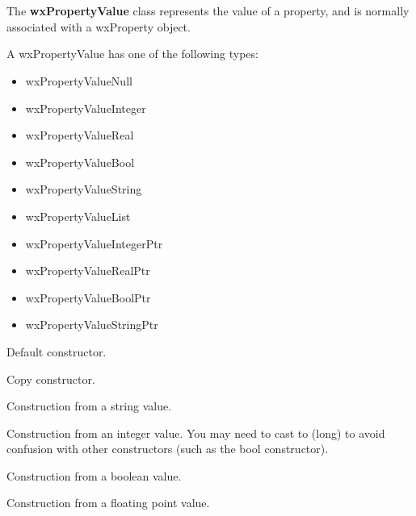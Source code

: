 \section{}\label{wxpropertyvalue}

The {\bf wxPropertyValue} class represents the value of a property,
and is normally associated with a wxProperty object.

A wxPropertyValue has one of the following types:

\begin{itemize}\itemsep=0pt
\item wxPropertyValueNull
\item wxPropertyValueInteger
\item wxPropertyValueReal
\item wxPropertyValueBool
\item wxPropertyValueString
\item wxPropertyValueList
\item wxPropertyValueIntegerPtr
\item wxPropertyValueRealPtr
\item wxPropertyValueBoolPtr
\item wxPropertyValueStringPtr
\end{itemize}




Default constructor.


Copy constructor.


Construction from a string value.


Construction from an integer value. You may need to cast to (long) to
avoid confusion with other constructors (such as the bool constructor).


Construction from a boolean value.


Construction from a floating point value.

